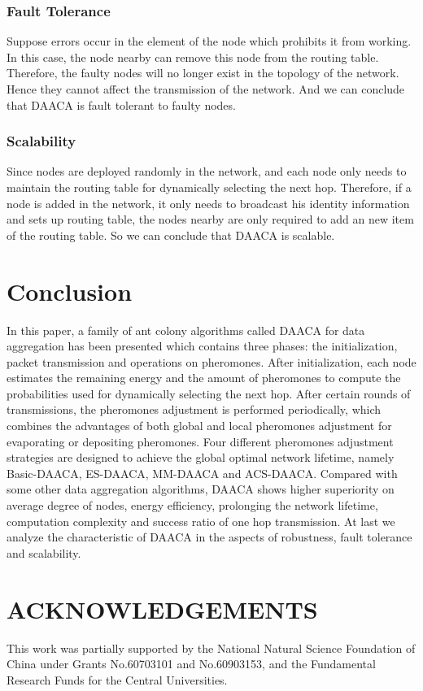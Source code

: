 \documentclass{elsarticle}
\begin{document}
\subsubsection{Fault Tolerance} \label{faultTolerance}
Suppose errors occur in the element of the node which prohibits it from working. In this case, the node nearby can remove this node from the routing table. Therefore, the faulty nodes will no longer exist in the topology of the network. Hence they cannot affect the transmission of the network. And we can conclude that DAACA is fault tolerant to faulty nodes.

\subsubsection{Scalability} \label{scalability}
Since nodes are deployed randomly in the network, and each node only needs to maintain the routing table for dynamically selecting the next hop. Therefore, if a node is added in the network, it only needs to broadcast his identity information and sets up routing table, the nodes nearby are only required to add an new item of the routing table. So we can conclude that DAACA is scalable.


\section{Conclusion} \label{conclusion}
In this paper, a family of ant colony algorithms called DAACA for data aggregation has been presented which contains three phases: the initialization, packet transmission and operations on pheromones. After initialization, each node estimates the remaining energy and the amount of pheromones to compute the probabilities used for dynamically selecting the next hop. After certain rounds of transmissions, the pheromones adjustment is performed periodically, which combines the advantages of both global and local pheromones adjustment for evaporating or depositing pheromones. Four different pheromones adjustment strategies are designed to achieve the global optimal network lifetime, namely Basic-DAACA, ES-DAACA, MM-DAACA and ACS-DAACA. Compared with some other data aggregation algorithms, DAACA shows higher superiority on average degree of nodes, energy efficiency, prolonging the network lifetime, computation complexity and success ratio of one hop transmission. At last we analyze the characteristic of DAACA in the aspects of robustness, fault tolerance and scalability.


\section*{ACKNOWLEDGEMENTS}
This work was partially supported by the National Natural Science Foundation of China under Grants No.60703101 and No.60903153, and the Fundamental Research Funds for the Central Universities.



\end{document}
